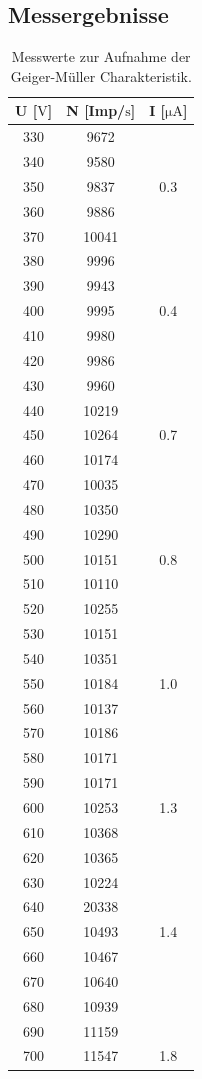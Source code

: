 \subsection{Messergebnisse}
\begin{table}
  \label{tab:Messwerte}
  \centering
  \caption{Messwerte zur Aufnahme der Geiger-Müller Charakteristik.}
  \begin{tabular}{c c c}
      \toprule
      {U [$\si{\volt}$]} & {N [Imp/$\si{\second}$]} & {I [$\si{\micro\ampere}$]}\\
      \midrule
      330& 9672 \\
      340& 9580 \\
      350& 9837& 0.3 \\
      360& 9886\\
      370& 10041\\
      380& 9996 \\
      390& 9943 \\
      400& 9995& 0.4 \\
      410& 9980 \\
      420& 9986 \\
      430& 9960 \\
      440& 10219\\
      450& 10264& 0.7 \\
      460& 10174 \\
      470& 10035 \\
      480& 10350 \\
      490& 10290 \\
      500& 10151& 0.8 \\
      510& 10110 \\
      520& 10255 \\
      530& 10151 \\
      540& 10351 \\
      550& 10184& 1.0 \\
      560& 10137 \\
      570& 10186 \\
      580& 10171 \\
      590& 10171 \\
      600& 10253& 1.3 \\
      610& 10368 \\
      620& 10365 \\
      630& 10224 \\
      640& 20338 \\
      650& 10493& 1.4 \\
      660& 10467\\
      670& 10640\\
      680& 10939\\
      690& 11159\\
      700& 11547& 1.8 \\
      \bottomrule
    \end{tabular}
\end{table}